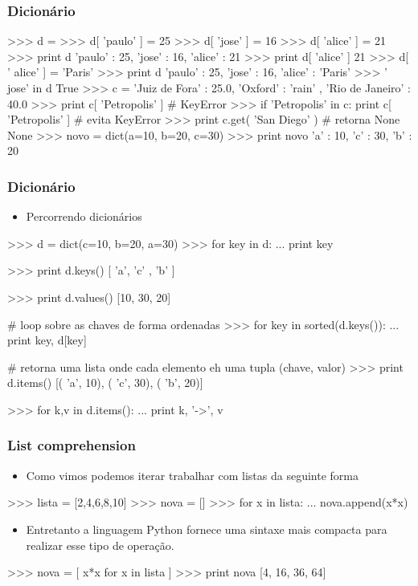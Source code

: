 \documentclass[12pt,t,graphics]{beamer}
\newcommand{\ft}[1]{\frametitle{#1}}
\newcommand{\bi}{\begin{itemize}}
\newcommand{\ei}{\end{itemize}}
\begin{document}

\begin{frame}[fragile]
  \ft{Dicionário}
  \vspace{-0.25cm}
  \begin{python}
>>> d = {}
>>> d[ 'paulo' ] = 25
>>> d[ 'jose' ] = 16
>>> d[ 'alice' ] = 21
>>> print d
{'paulo' : 25, 'jose' : 16, 'alice' : 21}
>>> print d[ 'alice' ]
21
>>> d[ ' alice' ] = 'Paris'
>>> print d
{'paulo' : 25, 'jose' : 16, 'alice' : 'Paris' }
>>> ' jose' in d
True
>>> c = {'Juiz de Fora' : 25.0, 'Oxford' : 'rain' , 'Rio de Janeiro' : 40.0}
>>> print c[ 'Petropolis' ] # KeyError
>>> if 'Petropolis' in c: print c[ 'Petropolis' ] # evita KeyError
>>> print c.get( 'San Diego' ) # retorna None
None
>>> novo = dict(a=10, b=20, c=30)
>>> print novo
{'a' : 10, 'c' : 30, 'b' : 20}		
  \end{python}
\end{frame}


\begin{frame}[fragile]
  \ft{Dicionário}
  \vspace{-0.25cm}
  \bi
\item Percorrendo dicionários
  \ei
  \begin{python}
>>> d = dict(c=10, b=20, a=30)
>>> for key in d:
...     print key

>>> print d.keys()
[ 'a', 'c' , 'b' ]

>>> print d.values()
[10, 30, 20]

# loop sobre as chaves de forma ordenadas
>>> for key in sorted(d.keys()):
...     print key, d[key]

# retorna uma lista onde cada elemento eh uma tupla (chave, valor)
>>> print d.items()
[( 'a', 10), ( 'c', 30), ( 'b', 20)]

>>> for k,v in d.items(): 
...     print k, '->', v		
  \end{python}	
\end{frame}


\begin{frame}[fragile]
  \ft{List comprehension}
  \bi
\item Como vimos podemos iterar trabalhar com listas
  da seguinte forma
  \ei
  \begin{python}
>>> lista = [2,4,6,8,10]
>>> nova = []
>>> for x in lista:
...     nova.append(x*x)		
  \end{python}
  \bi
\item Entretanto a linguagem Python fornece uma
  sintaxe mais compacta para realizar esse tipo de
  operação.
  \ei
  \begin{python}
>>> nova = [ x*x for x in lista ]
>>> print nova
[4, 16, 36, 64]		
  \end{python}
\end{frame}
\end{document}
